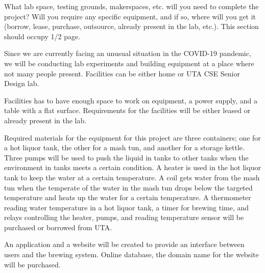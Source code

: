 What lab space, testing grounds, makerspaces, etc. will you need to complete the project? Will you require any specific equipment, and if so, where will you get it (borrow, lease, purchase, outsource, already present in the lab, etc.). This section should occupy 1/2 page.

Since we are currently facing an unusual situation in the COVID-19 pandemic, we will be conducting lab experiments and building equipment at a place where not many people present. Facilities can be either home or UTA CSE Senior Design lab. 

Facilities has to have enough space to work on equipment, a power supply, and a table with a flat surface. Requirements for the facilities will be either leased or already present in the lab. 

Required materials for the equipment for this project are three containers; one for a hot liquor tank, the other for a mash tun, and another for a storage kettle. Three pumps will be used to push the liquid in tanks to other tanks when the environment in tanks meets a certain condition. A heater is used in the hot liquor tank to keep the water at a certain temperature. A coil gets water from the mash tun when the temperate of the water in the mash tun drops below the targeted temperature and heats up the water for a certain temperature. A thermometer reading water temperature in a hot liquor tank, a timer for brewing time, and relays controlling the heater, pumps, and reading temperature sensor will be purchased or borrowed from UTA. 

An application and a website will be created to provide an interface between users and the brewing system. Online database, the domain name for the website will be purchased.
